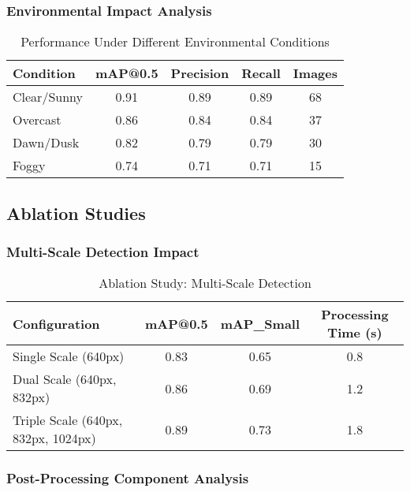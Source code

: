 \documentclass[a4paper,11pt]{article}
\begin{document}
\subsubsection{Environmental Impact Analysis}

\begin{table}[H]
\centering
\caption{Performance Under Different Environmental Conditions}
\label{tab:environmental_performance}
\begin{tabular}{@{}lcccc@{}}
\toprule
Condition & mAP@0.5 & Precision & Recall & Images \\
\midrule
Clear/Sunny & 0.91 & 0.89 & 0.89 & 68 \\
Overcast & 0.86 & 0.84 & 0.84 & 37 \\
Dawn/Dusk & 0.82 & 0.79 & 0.79 & 30 \\
Foggy & 0.74 & 0.71 & 0.71 & 15 \\
\bottomrule
\end{tabular}
\end{table}

\subsection{Ablation Studies}

\subsubsection{Multi-Scale Detection Impact}

\begin{table}[H]
\centering
\caption{Ablation Study: Multi-Scale Detection}
\label{tab:multiscale_ablation}
\begin{tabular}{@{}lccc@{}}
\toprule
Configuration & mAP@0.5 & mAP\_Small & Processing Time (s) \\
\midrule
Single Scale (640px) & 0.83 & 0.65 & 0.8 \\
Dual Scale (640px, 832px) & 0.86 & 0.69 & 1.2 \\
Triple Scale (640px, 832px, 1024px) & 0.89 & 0.73 & 1.8 \\
\bottomrule
\end{tabular}
\end{table}

\subsubsection{Post-Processing Component Analysis}
\end{document}
